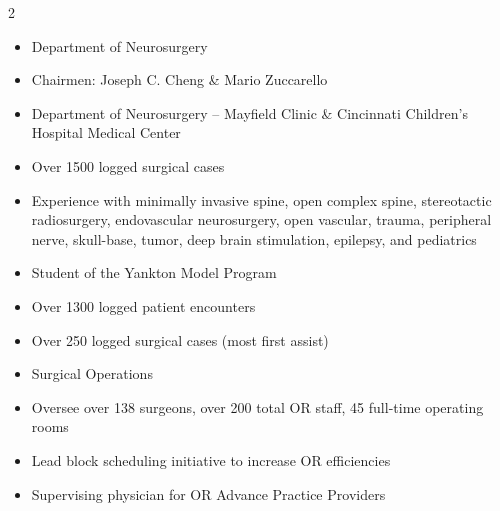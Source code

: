 \documentclass[10pt,a4paper,withhyper]{altacv}
\begin{document}
\begin{paracol}{2}
\divider

\begin{itemize}
\item Department of Neurosurgery
\item Chairmen: Joseph C. Cheng \& Mario Zuccarello
\end{itemize}

\divider

\begin{itemize}
\item Department of Neurosurgery -- Mayfield Clinic \& Cincinnati Children's Hospital Medical Center
\item Over 1500 logged surgical cases
\item Experience with minimally invasive spine, open complex spine, stereotactic radiosurgery, endovascular neurosurgery, open vascular, trauma, peripheral nerve, skull-base, tumor, deep brain stimulation, epilepsy, and pediatrics
\end{itemize}

\divider

\begin{itemize}
\item Student of the Yankton Model Program
\item Over 1300 logged patient encounters
\item Over 250 logged surgical cases (most first assist)
\end{itemize}

\divider



\begin{itemize}
\item Surgical Operations
\item Oversee over 138 surgeons, over 200 total OR staff, 45 full-time operating rooms
\item Lead block scheduling initiative to increase OR efficiencies
\item Supervising physician for OR Advance Practice Providers
\end{itemize}


\end{paracol}
\end{document}
